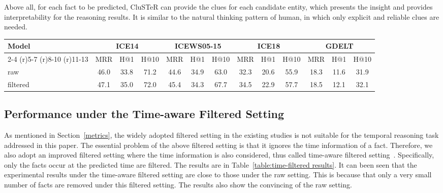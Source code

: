 \documentclass[11pt,a4paper]{article}
\begin{document}
Above all, for each fact to be predicted, CluSTeR can provide the clues for each
candidate entity, which presents the insight and provides interpretability for
the reasoning results. It is similar to the natural thinking pattern of human,
in which only explicit and reliable clues are needed.

\begin{table*}[htb]
  \small
  \centering
  \begin{tabular}{lcccccccccccc}
      
  \toprule
  \multirow{2}{*}{Model} &\multicolumn{3}{c}{ICE14} &\multicolumn{3}{c}{ICEWS05-15} &\multicolumn{3}{c}{ICE18} &\multicolumn{3}{c}{GDELT}\\
  \cmidrule(r){2-4}  \cmidrule(r){5-7} \cmidrule(r){8-10} \cmidrule(r){11-13}  &MRR &H@1 &H@10
  &MRR &H@1 &H@10 &MRR &H@1 &H@10 &MRR &H@1 &H@10\\
    \midrule
  raw\!\!\! &46.0  &{33.8}  &{71.2}   &{44.6}  & {34.9}  & {63.0}  & {32.3}  &{20.6}   & {55.9} & 18.3  & 11.6   & 31.9\\
  filtered\!\!\! &{47.1}  &{35.0}  &{72.0}   &{45.4}  & {34.3}  & {67.7}  & {34.5}  &{22.9}   & {57.7} & 18.5  & 12.1   & 32.1\\
  \bottomrule
  \end{tabular}
  \vspace{-2mm}
  \caption{Experimental results under the raw setting and the (time-aware) filter setting.}
  \label{table:time-filtered results}
  \end{table*}


\subsection{Performance under the Time-aware Filtered Setting}
As mentioned in Section~\ref{metrics}, the widely adopted filtered setting in
the existing studies is not suitable for the temporal reasoning task
addressed in this paper. The essential problem of the above filtered setting is
that it ignores the time information of a fact. Therefore, we also adopt an
improved filtered setting where the time information is also considered, thus
called time-aware filtered setting~\cite{han2020graph, hanexplainable}. Specifically, only the
facts occur at the predicted time are filtered. The results are in
Table~\ref{table:time-filtered results}. It can been seen that the experimental
results under the time-aware filtered setting are close to those under the raw
setting. This is because that only a very small number of facts are removed
under this filtered setting. The results also show the convincing of the
raw setting.
\end{document}

